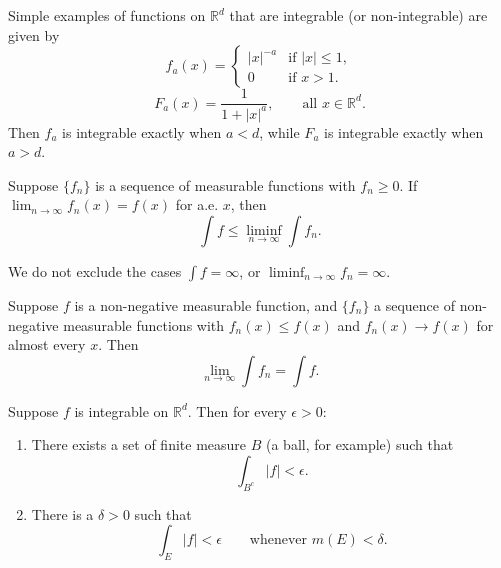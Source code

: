 \begin{example}
    Simple examples of functions on $\mathbb{R}^d$ that are integrable
    (or non-integrable) are given by
    \begin{equation}
        f_a(x) =
        \begin{cases}
            |x|^{-a} & \text{if } |x| \leq 1,\\
            0 & \text{if } x > 1.
        \end{cases}
    \end{equation}
    \begin{equation}
        F_a(x) = \frac{1}{1 + |x|^a}, \qquad \text{all } x \in \mathbb{R}^d.
    \end{equation}
    Then $f_a$ is integrable exactly when $a < d$, while $F_a$ is integrable
    exactly when $a > d$.
\end{example}

\begin{lemma}[Fatou]
    Suppose $\{f_n\}$ is a sequence of measurable functions with $f_n \geq 0$.
    If $\lim_{n \to \infty} f_n(x) = f(x)$ for a.e. $x$, then
    \begin{equation}
        \int f \leq \liminf_{n \to \infty} \int f_n.
    \end{equation}
\end{lemma}

\begin{remark}
    We do not exclude the cases $\int f = \infty$,
    or $\liminf_{n \to \infty} f_n = \infty$.
\end{remark}

\begin{corollary}
    Suppose $f$ is a non-negative measurable function, and $\{f_n\}$ a sequence
    of non-negative measurable functions with
    $f_n(x) \leq f(x)$ and $f_n(x) \to f(x)$ for almost every $x$. Then
    \begin{equation}
        \lim_{n \to \infty} \int f_n = \int f.
    \end{equation}
\end{corollary}

\begin{proposition}
    Suppose $f$ is integrable on $\mathbb{R}^d$. Then for every $\epsilon > 0$:
    \begin{enumerate}
        \renewcommand{\theenumi}{\roman{enumi}}
        \item There exists a set of finite measure $B$ (a ball, for example) such that
        \begin{equation}
            \int_{B^c} |f| < \epsilon.
        \end{equation}
        \item There is a $\delta > 0$ such that
        \begin{equation}
            \int_E |f| < \epsilon \qquad \text{whenever } m(E) < \delta.
        \end{equation}
    \end{enumerate}
\end{proposition}

